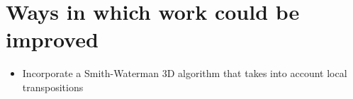 \section{Ways in which work could be improved}

\begin{itemize}
\item Incorporate a Smith-Waterman 3D algorithm that takes into account local transpositions \cite{allali2007local} \cite{hanna2008improvements}
\end{itemize}